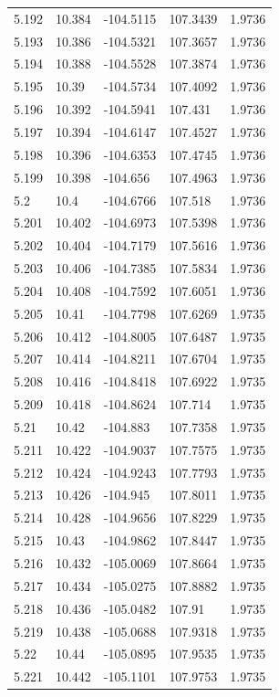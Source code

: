 \begin{tabular}{lllll}
5.192 & 10.384 & -104.5115 & 107.3439 & 1.9736 \\
5.193 & 10.386 & -104.5321 & 107.3657 & 1.9736 \\
5.194 & 10.388 & -104.5528 & 107.3874 & 1.9736 \\
5.195 & 10.39 & -104.5734 & 107.4092 & 1.9736 \\
5.196 & 10.392 & -104.5941 & 107.431 & 1.9736 \\
5.197 & 10.394 & -104.6147 & 107.4527 & 1.9736 \\
5.198 & 10.396 & -104.6353 & 107.4745 & 1.9736 \\
5.199 & 10.398 & -104.656 & 107.4963 & 1.9736 \\
5.2 & 10.4 & -104.6766 & 107.518 & 1.9736 \\
5.201 & 10.402 & -104.6973 & 107.5398 & 1.9736 \\
5.202 & 10.404 & -104.7179 & 107.5616 & 1.9736 \\
5.203 & 10.406 & -104.7385 & 107.5834 & 1.9736 \\
5.204 & 10.408 & -104.7592 & 107.6051 & 1.9736 \\
5.205 & 10.41 & -104.7798 & 107.6269 & 1.9735 \\
5.206 & 10.412 & -104.8005 & 107.6487 & 1.9735 \\
5.207 & 10.414 & -104.8211 & 107.6704 & 1.9735 \\
5.208 & 10.416 & -104.8418 & 107.6922 & 1.9735 \\
5.209 & 10.418 & -104.8624 & 107.714 & 1.9735 \\
5.21 & 10.42 & -104.883 & 107.7358 & 1.9735 \\
5.211 & 10.422 & -104.9037 & 107.7575 & 1.9735 \\
5.212 & 10.424 & -104.9243 & 107.7793 & 1.9735 \\
5.213 & 10.426 & -104.945 & 107.8011 & 1.9735 \\
5.214 & 10.428 & -104.9656 & 107.8229 & 1.9735 \\
5.215 & 10.43 & -104.9862 & 107.8447 & 1.9735 \\
5.216 & 10.432 & -105.0069 & 107.8664 & 1.9735 \\
5.217 & 10.434 & -105.0275 & 107.8882 & 1.9735 \\
5.218 & 10.436 & -105.0482 & 107.91 & 1.9735 \\
5.219 & 10.438 & -105.0688 & 107.9318 & 1.9735 \\
5.22 & 10.44 & -105.0895 & 107.9535 & 1.9735 \\
5.221 & 10.442 & -105.1101 & 107.9753 & 1.9735 \\

\end{tabular}
